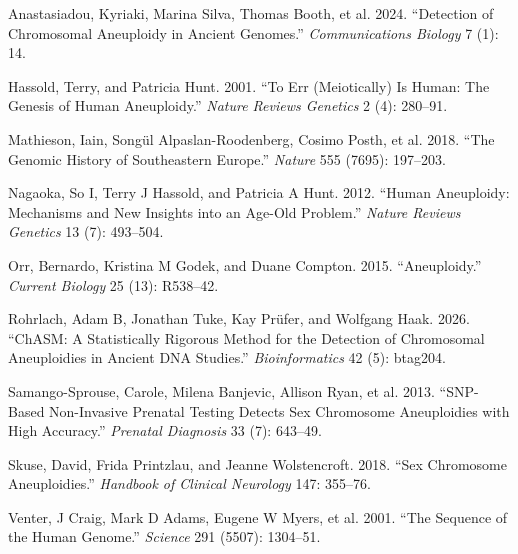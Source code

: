 \documentclass[
  letterpaper,
  DIV=11,
  numbers=noendperiod]{scrartcl}
\newlength{\cslhangindent}
\newenvironment{CSLReferences}[2] %
 {\begin{list}{}{%
  \setlength{\itemindent}{0pt}
  \setlength{\leftmargin}{0pt}
  \setlength{\parsep}{0pt}
  \ifodd #1
   \setlength{\leftmargin}{\cslhangindent}
   \setlength{\itemindent}{-1\cslhangindent}
  \fi
  \setlength{\itemsep}{#2\baselineskip}}}
 {\end{list}}
\begin{document}
\protect{}\label{refs}
\begin{CSLReferences}{1}{1}
{Anastasiadou, Kyriaki, Marina Silva, Thomas Booth, et al.} 2024.
{``Detection of Chromosomal Aneuploidy in Ancient Genomes.''}
\emph{Communications Biology} 7 (1): 14.

Hassold, Terry, and Patricia Hunt. 2001. {``To Err (Meiotically) Is
Human: The Genesis of Human Aneuploidy.''} \emph{Nature Reviews
Genetics} 2 (4): 280--91.

{Mathieson, Iain, Songül Alpaslan-Roodenberg, Cosimo Posth, et al.}
2018. {``The Genomic History of Southeastern {Europe}.''} \emph{Nature}
555 (7695): 197--203.

Nagaoka, So I, Terry J Hassold, and Patricia A Hunt. 2012. {``Human
Aneuploidy: Mechanisms and New Insights into an Age-Old Problem.''}
\emph{Nature Reviews Genetics} 13 (7): 493--504.

Orr, Bernardo, Kristina M Godek, and Duane Compton. 2015.
{``Aneuploidy.''} \emph{Current Biology} 25 (13): R538--42.

Rohrlach, Adam B, Jonathan Tuke, Kay Prüfer, and Wolfgang Haak. 2026.
{``{ChASM}: A Statistically Rigorous Method for the Detection of
Chromosomal Aneuploidies in Ancient {DNA} Studies.''}
\emph{Bioinformatics} 42 (5): btag204.

{Samango-Sprouse, Carole, Milena Banjevic, Allison Ryan, et al.} 2013.
{``{SNP}-Based Non-Invasive Prenatal Testing Detects Sex Chromosome
Aneuploidies with High Accuracy.''} \emph{Prenatal Diagnosis} 33 (7):
643--49.

Skuse, David, Frida Printzlau, and Jeanne Wolstencroft. 2018. {``Sex
Chromosome Aneuploidies.''} \emph{Handbook of Clinical Neurology} 147:
355--76.

{Venter, J Craig, Mark D Adams, Eugene W Myers, et al.} 2001. {``The
Sequence of the Human Genome.''} \emph{Science} 291 (5507): 1304--51.

\end{CSLReferences}
\end{document}
